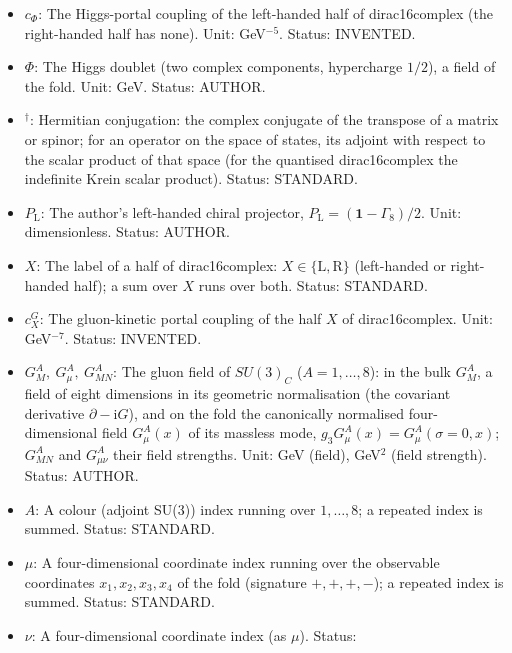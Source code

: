 \documentclass[
  10pt,
]{article}
\begin{document}
\begin{itemize}
  \(16 \times 16\) matrix (with a derivative along the fold) built from
  the Standard-Model fields at the fold by varying the portals with
  respect to \(\bar\Psi\). Unit: GeV\(^{-3}\) (so that
  \(\mathbb{M}/V_*\) is dimensionless). Status: DERIVED.
\item
  \(c_\Phi\): The Higgs-portal coupling of the left-handed half of
  dirac16complex (the right-handed half has none). Unit: GeV\(^{-5}\).
  Status: INVENTED.
\item
  \(\Phi\): The Higgs doublet (two complex components, hypercharge
  \(1/2\)), a field of the fold. Unit: GeV. Status: AUTHOR.
\item
  \({}^\dagger\): Hermitian conjugation: the complex conjugate of the
  transpose of a matrix or spinor; for an operator on the space of
  states, its adjoint with respect to the scalar product of that space
  (for the quantised dirac16complex the indefinite Krein scalar
  product). Status: STANDARD.
\item
  \(P_{\mathrm{L}}\): The author's left-handed chiral projector,
  \(P_{\mathrm{L}} = (\mathbf{1} - \Gamma_8)/2\). Unit: dimensionless.
  Status: AUTHOR.
\item
  \(X\): The label of a half of dirac16complex:
  \(X \in \{\mathrm{L}, \mathrm{R}\}\) (left-handed or right-handed
  half); a sum over \(X\) runs over both. Status: STANDARD.
\item
  \(c^{G}_X\): The gluon-kinetic portal coupling of the half \(X\) of
  dirac16complex. Unit: GeV\(^{-7}\). Status: INVENTED.
\item
  \(G^A_M,\ G^A_\mu,\ G^A_{MN}\): The gluon field of \(SU(3)_C\)
  (\(A = 1, \dots, 8\)): in the bulk \(G^A_M\), a field of eight
  dimensions in its geometric normalisation (the covariant derivative
  \(\partial - \mathrm{i}G\)), and on the fold the canonically
  normalised four-dimensional field \(G^A_\mu(x)\) of its massless mode,
  \(g_3G^A_\mu(x) = G^A_\mu(\sigma = 0, x)\); \(G^A_{MN}\) and
  \(G^A_{\mu\nu}\) their field strengths. Unit: GeV (field), GeV\(^2\)
  (field strength). Status: AUTHOR.
\item
  \(A\): A colour (adjoint SU(3)) index running over \(1, \dots, 8\); a
  repeated index is summed. Status: STANDARD.
\item
  \(\mu\): A four-dimensional coordinate index running over the
  observable coordinates \(x_1, x_2, x_3, x_4\) of the fold (signature
  \(+,+,+,-\)); a repeated index is summed. Status: STANDARD.
\item
  \(\nu\): A four-dimensional coordinate index (as \(\mu\)). Status:

\end{itemize}
\end{document}
